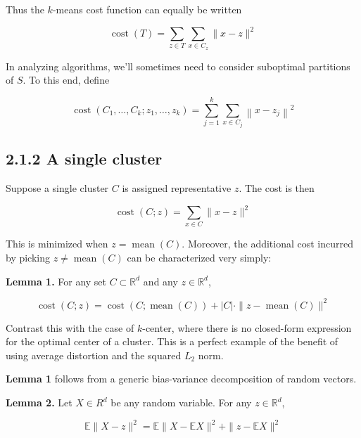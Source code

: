 \documentclass{article}
\begin{document}
Thus the $k$-means cost function can equally be written

\begin{equation*}
\operatorname{cost}(T)=\sum_{z \in T} \sum_{x \in C_{z}}\|x-z\|^{2}
\end{equation*}

In analyzing algorithms, we'll sometimes need to consider suboptimal partitions of $S$. To this end, define

\begin{equation*}
\operatorname{cost}\left(C_{1}, \ldots, C_{k} ; z_{1}, \ldots, z_{k}\right)=\sum_{j=1}^{k} \sum_{x \in C_{j}}\left\|x-z_{j}\right\|^{2}
\end{equation*}

\subsection*{2.1.2 A single cluster}

Suppose a single cluster $C$ is assigned representative $z$. The cost is then

\begin{equation*}
\operatorname{cost}(C ; z)=\sum_{x \in C}\|x-z\|^{2}
\end{equation*}

This is minimized when $z=\operatorname{mean}(C)$. Moreover, the additional cost incurred by picking $z \neq \operatorname{mean}(C)$ can be characterized very simply:

\textbf{Lemma 1.} For any set $C \subset \mathbb{R}^{d}$ and any $z \in \mathbb{R}^{d}$,

\begin{equation*}
\operatorname{cost}(C ; z)=\operatorname{cost}(C ; \operatorname{mean}(C))+|C| \cdot\|z-\operatorname{mean}(C)\|^{2}
\end{equation*}

Contrast this with the case of $k$-center, where there is no closed-form expression for the optimal center of a cluster. This is a perfect example of the benefit of using average distortion and the squared $L_{2}$ norm.

\textbf{Lemma 1} follows from a generic bias-variance decomposition of random vectors.

\textbf{Lemma 2.} Let $X \in R^{d}$ be any random variable. For any $z \in \mathbb{R}^{d}$,

\begin{equation*}
\mathbb{E}\|X-z\|^{2}=\mathbb{E}\|X-\mathbb{E} X\|^{2}+\|z-\mathbb{E} X\|^{2}
\end{equation*}
\end{document}
